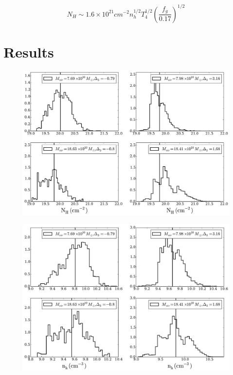 \documentclass[a4,useAMS,usenatbib,usegraphicx]{mn2e}
\newcommand{\mnras}{MNRAS}
\begin{document}
\begin{equation}
N_H \sim 1.6 \times 10^{21} cm^{-2} n_h^{1/2}T_4^{1/2} \left(
\dfrac{f_g}{0.17}\right)^{1/2}
\end{equation}



\section{Results}

\begin{figure}
\centering
\includegraphics[scale=0.5]{../figures/NHvsMvsD3.pdf}
\legend{\caption{}}
\end{figure}

\begin{figure}
\centering
\includegraphics[scale=0.5]{../figures/NHIvsMvsD3.pdf}
\end{figure}








\end{document}
